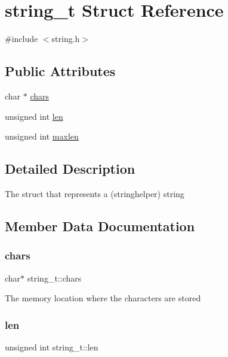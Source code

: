 \hypertarget{structstring__t}{}\section{string\+\_\+t Struct Reference}
\label{structstring__t}


{\ttfamily \#include $<$string.\+h$>$}

\subsection*{Public Attributes}
\begin{DoxyCompactItemize}
\item 
char $\ast$ \mbox{\hyperlink{structstring__t_a3ee99533f7f79aef392a8c6c609649af}{chars}}
\item 
unsigned int \mbox{\hyperlink{structstring__t_a05df4b0f65ab4d12459767fe2163aa07}{len}}
\item 
unsigned int \mbox{\hyperlink{structstring__t_aec6779bd44889730e24d6a682f3607f7}{maxlen}}
\end{DoxyCompactItemize}


\subsection{Detailed Description}
The struct that represents a (stringhelper) string 

\subsection{Member Data Documentation}
\mbox{\label{structstring__t_a3ee99533f7f79aef392a8c6c609649af}} 
\subsubsection{\texorpdfstring{chars}{chars}}
{\footnotesize\ttfamily char$\ast$ string\+\_\+t\+::chars}

The memory location where the characters are stored \mbox{\label{structstring__t_a05df4b0f65ab4d12459767fe2163aa07}} 
\subsubsection{\texorpdfstring{len}{len}}
{\footnotesize\ttfamily unsigned int string\+\_\+t\+::len}

